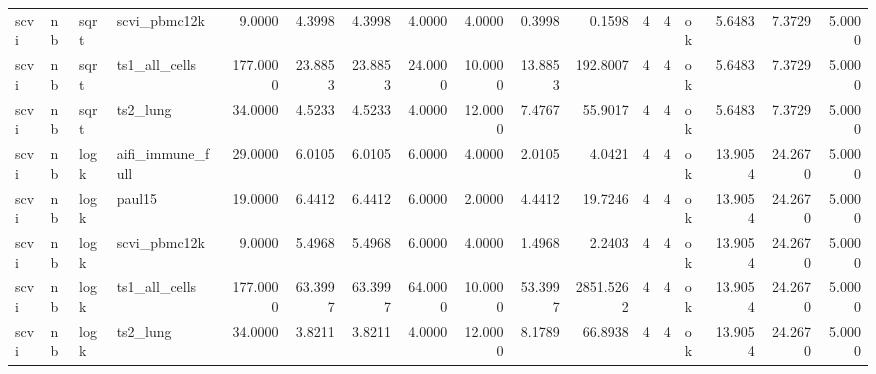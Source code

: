 \begin{tabular}{llllrrrrrrrrrlrrr}
scvi & nb & sqrt & scvi\_pbmc12k & 9.0000 & 4.3998 & 4.3998 & 4.0000 & 4.0000 & 0.3998 & 0.1598 & 4 & 4 & ok & 5.6483 & 7.3729 & 5.0000 \\
scvi & nb & sqrt & ts1\_all\_cells & 177.0000 & 23.8853 & 23.8853 & 24.0000 & 10.0000 & 13.8853 & 192.8007 & 4 & 4 & ok & 5.6483 & 7.3729 & 5.0000 \\
scvi & nb & sqrt & ts2\_lung & 34.0000 & 4.5233 & 4.5233 & 4.0000 & 12.0000 & 7.4767 & 55.9017 & 4 & 4 & ok & 5.6483 & 7.3729 & 5.0000 \\
scvi & nb & logk & aifi\_immune\_full & 29.0000 & 6.0105 & 6.0105 & 6.0000 & 4.0000 & 2.0105 & 4.0421 & 4 & 4 & ok & 13.9054 & 24.2670 & 5.0000 \\
scvi & nb & logk & paul15 & 19.0000 & 6.4412 & 6.4412 & 6.0000 & 2.0000 & 4.4412 & 19.7246 & 4 & 4 & ok & 13.9054 & 24.2670 & 5.0000 \\
scvi & nb & logk & scvi\_pbmc12k & 9.0000 & 5.4968 & 5.4968 & 6.0000 & 4.0000 & 1.4968 & 2.2403 & 4 & 4 & ok & 13.9054 & 24.2670 & 5.0000 \\
scvi & nb & logk & ts1\_all\_cells & 177.0000 & 63.3997 & 63.3997 & 64.0000 & 10.0000 & 53.3997 & 2851.5262 & 4 & 4 & ok & 13.9054 & 24.2670 & 5.0000 \\
scvi & nb & logk & ts2\_lung & 34.0000 & 3.8211 & 3.8211 & 4.0000 & 12.0000 & 8.1789 & 66.8938 & 4 & 4 & ok & 13.9054 & 24.2670 & 5.0000 \\
\bottomrule
\end{tabular}
